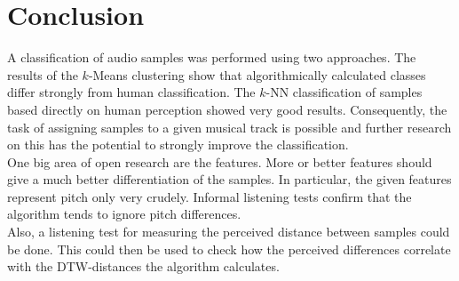 \section{Conclusion}
A classification of audio samples was performed using two approaches. The results of the $k$-Means clustering show that algorithmically calculated classes differ strongly from human classification. The $k$-NN classification of samples based directly on human perception showed very good results. Consequently, the task of assigning samples to a given musical track is possible and further research on this has the potential to strongly improve the classification.\\
One big area of open research are the features. More or better features should give a much better differentiation of the samples. In particular, the given features represent pitch only very crudely. Informal listening tests confirm that the algorithm tends to ignore pitch differences.\\
Also, a listening test for measuring the perceived distance between samples could be done. This could then be used to check how the perceived differences correlate with the DTW-distances the algorithm calculates.